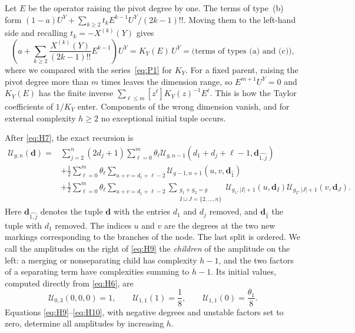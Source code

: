 Let \(E\) be the operator raising the pivot degree by one. The terms of
type~(b) form \((1-a)U^Y+\sum_{k\ge2}t_kE^{k-1}U^Y/(2k-1)!!\). Moving them
to the left-hand side and recalling \(t_k=-X^{(k)}(Y)\) gives
\[
\left(a+\sum_{k\ge2}\frac{X^{(k)}(Y)}{(2k-1)!!}E^{k-1}\right)U^Y
=K_Y(E)\,U^Y=\bigl(\text{terms of types (a) and (c)}\bigr),
\]
where we compared with the series~\eqref{eq:P1} for \(K_Y\). For a fixed
parent, raising the pivot degree more than \(m\) times leaves the
dimension range, so \(E^{m+1}U^Y=0\) and \(K_Y(E)\) has the finite inverse
\(\sum_{\ell\le m}[z^\ell]K_Y(z)^{-1}E^\ell\). This is how the Taylor
coefficients of \(1/K_Y\) enter. Components of the wrong dimension vanish,
and for external complexity \(h\ge2\) no exceptional initial tuple occurs.

After \eqref{eq:H7}, the exact recursion is \begin{equation}
\begin{aligned}
\mathcal U_{g,n}(\mathbf d)={}&
\sum_{j=2}^n(2d_j+1)\sum_{\ell=0}^m\theta_\ell
 \mathcal U_{g,n-1}(d_1+d_j+\ell-1,\mathbf d_{\widehat{1,j}})\\
&+\frac12\sum_{\ell=0}^m\theta_\ell
 \sum_{u+v=d_1+\ell-2}
 \mathcal U_{g-1,n+1}(u,v,\mathbf d_{\widehat1})\\
&+\frac12\sum_{\ell=0}^m\theta_\ell
 \sum_{u+v=d_1+\ell-2}
 \sum_{\substack{g_1+g_2=g\\I\sqcup J=\{2,\ldots,n\}}}
 \mathcal U_{g_1,|I|+1}(u,\mathbf d_I)
 \mathcal U_{g_2,|J|+1}(v,\mathbf d_J).
\end{aligned}\label{eq:H9}
\end{equation} Here $\mathbf d_{\widehat{1,j}}$ denotes the tuple $\mathbf d$ with the entries $d_1$ and $d_j$ removed, and $\mathbf d_{\widehat1}$ the tuple with $d_1$ removed. The indices $u$ and $v$ are the degrees at the two new markings corresponding to the branches of the node. The last split is ordered. We call the amplitudes on the right of \eqref{eq:H9} the \emph{children} of the amplitude on the left: a merging or nonseparating child has complexity $h-1$, and the two factors of a separating term have complexities summing to $h-1$. Its initial values, computed directly from
\eqref{eq:H6}, are \begin{equation}
\mathcal U_{0,3}(0,0,0)=1,\qquad
\mathcal U_{1,1}(1)=\frac18,\qquad
\mathcal U_{1,1}(0)=\frac{\theta_1}{8}.
\label{eq:H10}
\end{equation} Equations \eqref{eq:H9}--\eqref{eq:H10}, with negative degrees and unstable factors set
to zero, determine all amplitudes by increasing \(h\).

